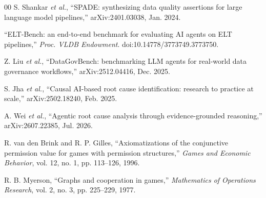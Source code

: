 \documentclass[conference]{IEEEtran}
\begin{document}
\begin{thebibliography}{00}
 S. Shankar \emph{et al.}, ``SPADE: synthesizing data quality assertions for large language model pipelines,'' arXiv:2401.03038, Jan. 2024.

 ``ELT-Bench: an end-to-end benchmark for evaluating AI agents on ELT pipelines,'' \emph{Proc. VLDB Endowment}. doi:10.14778/3773749.3773750.

 Z. Liu \emph{et al.}, ``DataGovBench: benchmarking LLM agents for real-world data governance workflows,'' arXiv:2512.04416, Dec. 2025.

 S. Jha \emph{et al.}, ``Causal AI-based root cause identification: research to practice at scale,'' arXiv:2502.18240, Feb. 2025.

 A. Wei \emph{et al.}, ``Agentic root cause analysis through evidence-grounded reasoning,'' arXiv:2607.22385, Jul. 2026.

 R. van den Brink and R. P. Gilles, ``Axiomatizations of the conjunctive permission value for games with permission structures,'' \emph{Games and Economic Behavior}, vol. 12, no. 1, pp. 113--126, 1996.

 R. B. Myerson, ``Graphs and cooperation in games,'' \emph{Mathematics of Operations Research}, vol. 2, no. 3, pp. 225--229, 1977.

\end{thebibliography}
\end{document}
